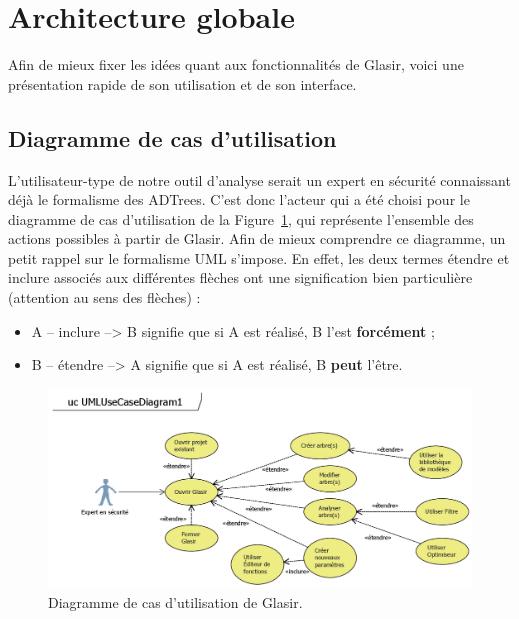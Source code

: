\section{Architecture globale}
    \label{sec:archiGlobale}
    
    Afin de mieux fixer les idées quant aux fonctionnalités de Glasir, voici une présentation rapide de son utilisation et de son interface.
	    
    \subsection{Diagramme de cas d'utilisation}
    \label{sec:casutil}
    
    L'utilisateur-type de notre outil d'analyse serait un expert en sécurité connaissant déjà le formalisme des ADTrees. C'est donc l'acteur qui a été choisi pour le diagramme de cas d'utilisation de la {\sc Figure}~\ref{fig:use_case}, qui représente l'ensemble des actions possibles à partir de Glasir. Afin de mieux comprendre ce diagramme, un petit rappel sur le formalisme UML s'impose. En effet, les deux termes \og étendre \fg{} et \og inclure \fg{} associés aux différentes flèches ont une signification bien particulière (attention au sens des flèches) :

    \begin{itemize}
    \item A -- \og inclure \fg{} --> B signifie que si A est réalisé, B l'est {\bf forcément} ;
    \item B -- \og étendre \fg{} --> A signifie que si A est réalisé, B {\bf peut} l'être.
    \end{itemize}

    \begin{figure}[H]
        \centering
        \includegraphics[height=0.5\textwidth]{figure/UseCaseDiagram.png}
        \caption{Diagramme de cas d'utilisation de Glasir.}
        \label{fig:use_case}
    \end{figure}

